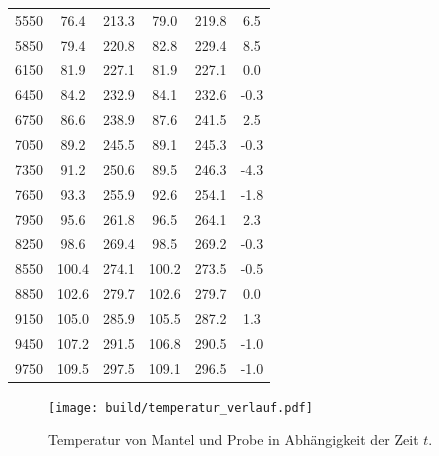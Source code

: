 \begin{table}
\begin{tabular}{c c c c c c}
  5550	&	76.4	&	213.3	&	79.0	&	219.8	&	6.5   \\
  5850	&	79.4	&	220.8	&	82.8	&	229.4	&	8.5   \\
  6150	&	81.9	&	227.1	&	81.9	&	227.1	&	0.0   \\
  6450	&	84.2	&	232.9	&	84.1	&	232.6	&	-0.3   \\
  6750	&	86.6	&	238.9	&	87.6	&	241.5	&	2.5   \\
  7050	&	89.2	&	245.5	&	89.1	&	245.3	&	-0.3   \\
  7350	&	91.2	&	250.6	&	89.5	&	246.3	&	-4.3   \\
  7650	&	93.3	&	255.9	&	92.6	&	254.1	&	-1.8   \\
  7950	&	95.6	&	261.8	&	96.5	&	264.1	&	2.3   \\
  8250	&	98.6	&	269.4	&	98.5	&	269.2	&	-0.3   \\
  8550	&	100.4	&	274.1	&	100.2	&	273.5	&	-0.5   \\
  8850	&	102.6	&	279.7	&	102.6	&	279.7	&	0.0   \\
  9150	&	105.0	&	285.9	&	105.5	&	287.2	&	1.3   \\
  9450	&	107.2	&	291.5	&	106.8	&	290.5	&	-1.0   \\
  9750	&	109.5	&	297.5	&	109.1	&	296.5	&	-1.0   \\
  \bottomrule
\end{tabular}
\end{table}

\begin{figure}
  \centering
  \texttt{[image: build/temperatur\_verlauf.pdf]}
  \caption{Temperatur von Mantel und Probe in Abhängigkeit der Zeit $t$.}
  \label{fig:T_mess}
\end{figure}


